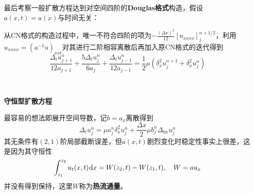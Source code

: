 \documentclass[a4paper,UTF8,fontset=windows]{ctexart}
\newcommand*{\dr}{\hspace{0.07em}\mathrm{d}}
\begin{document}
最后考察一般扩散方程达到对空间四阶的\textbf{Douglas格式}构造，假设$a(x,t)=a(x)$与时间无关：

从CN格式的构造过程中，唯一不符合四阶的项为$-\frac{(\Delta x)^2}{12}[u_{xxxx}]_j^{n+1/2}$，利用$u_{xxxx}=(a^{-1}u)_{xxt}$对其进行二阶相容离散后再加入原CN格式的迭代得到
$$\frac{\Delta_tu_{j+1}^n}{12a_{j+1}}+\frac{5\Delta_tu_j^n}{6a_j}+\frac{\Delta_tu_{j-1}^n}{12a_{j-1}}=\frac{1}{2}\mu(\delta_x^2u_j^{n+1}+\delta_x^2u_j^n)$$

\

\textbf{守恒型扩散方程}

最容易的想法即展开空间导数，记$b=a_x$离散得到
$$\Delta_tu_j^n=\mu a_j^n\delta_x^2u_j^n+\frac{\Delta x}{2}\mu b_j^n\Delta_{0x}u_j^n$$
其无条件有$(2,1)$阶局部截断误差，但$a(x,t)$剧烈变化时稳定性事实上很差，这是因为其守恒性
$$\int_{z_1}^{z_2}u_t(x,t)\dr x=W(z_2,t)-W(z_1,t),\quad W=au_x$$
并没有得到保持，这里$W$称为\textbf{热流通量}。
\end{document}
